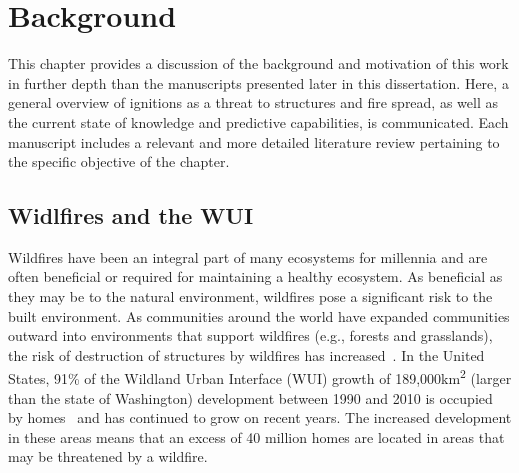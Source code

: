 
\chapter{Background}
\label{part:literature}
    This chapter provides a discussion of the background and motivation of this work in further depth than the manuscripts presented later in this dissertation. Here, a general overview of ignitions as a threat to structures and fire spread, as well as the current state of knowledge and predictive capabilities, is communicated. Each manuscript includes a relevant and more detailed literature review pertaining to the specific objective of the chapter. 

\section{Widlfires and the WUI}
    Wildfires have been an integral part of many ecosystems for millennia and are often beneficial or required for maintaining a healthy ecosystem. As beneficial as they may be to the natural environment, wildfires pose a significant risk to the built environment. As communities around the world have expanded communities outward into environments that support wildfires (e.g., forests and grasslands), the risk of destruction of structures by wildfires has increased~\cite{Hammer2009DemographicManagement}. In the United States, 91\% of the Wildland Urban Interface (WUI)  growth of 189,000\si{\kilo\meter\squared} (larger than the state of Washington) development between 1990 and 2010 is occupied by homes~\cite{Radeloff2017} and has continued to grow on recent years. The increased development in these areas means that an excess of 40 million homes are located in areas that may be threatened by a wildfire. 
    
